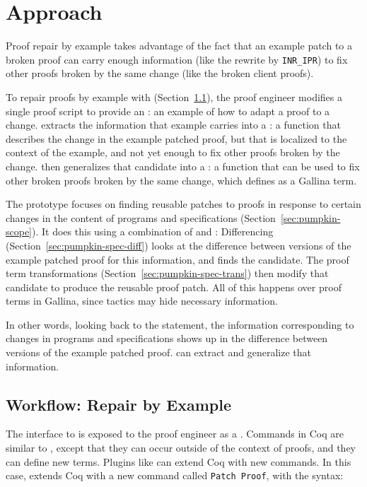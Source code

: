 \section{Approach}
\label{sec:pumpkin-approach}

Proof repair by example takes advantage of the fact that an example patch to a broken proof can carry enough 
information (like the rewrite by \lstinline{INR_IPR}) to fix other proofs broken by the same change (like the broken
client proofs).

To repair proofs by example with \sysname (Section~\ref{sec:pumpkin-workflow}), the proof engineer modifies a single proof script to provide 
an : an example of how to adapt a proof to a change.
\sysname extracts the information that example carries into a : a function that describes the change 
in the example patched proof,
but that is localized to the context of the example, and not yet enough to fix other proofs broken by the change.
\sysname then generalizes that candidate into a : a function
that can be used to fix other broken proofs broken by the same change, which \sysname defines as a Gallina term.

The \sysname prototype focuses on finding reusable patches to proofs in response to certain changes in the content of programs and specifications (Section~\ref{sec:pumpkin-scope}).
It does this using a combination of  and :
Differencing (Section~\ref{sec:pumpkin-spec-diff}) looks at the difference between versions of the example patched proof for this information, and finds the candidate.
The proof term transformations (Section~\ref{sec:pumpkin-spec-trans}) then modify that candidate to produce the reusable proof patch.
All of this happens over proof terms in Gallina, since tactics may hide necessary information. %

In other words, looking back to the  statement, the information corresponding to changes in programs and specifications
shows up in the difference between versions of the example patched proof.
\sysname can extract and generalize that information.

\subsection{Workflow: Repair by Example}
\label{sec:pumpkin-workflow}

The interface to \sysname is exposed to the proof engineer as a .
Commands in Coq are similar to , except that they can occur outside of the context of proofs, and they can define new terms.
Plugins like \sysname can extend Coq with new commands.
In this case, \sysname extends Coq with a new command called \lstinline{Patch Proof}, with the syntax:

